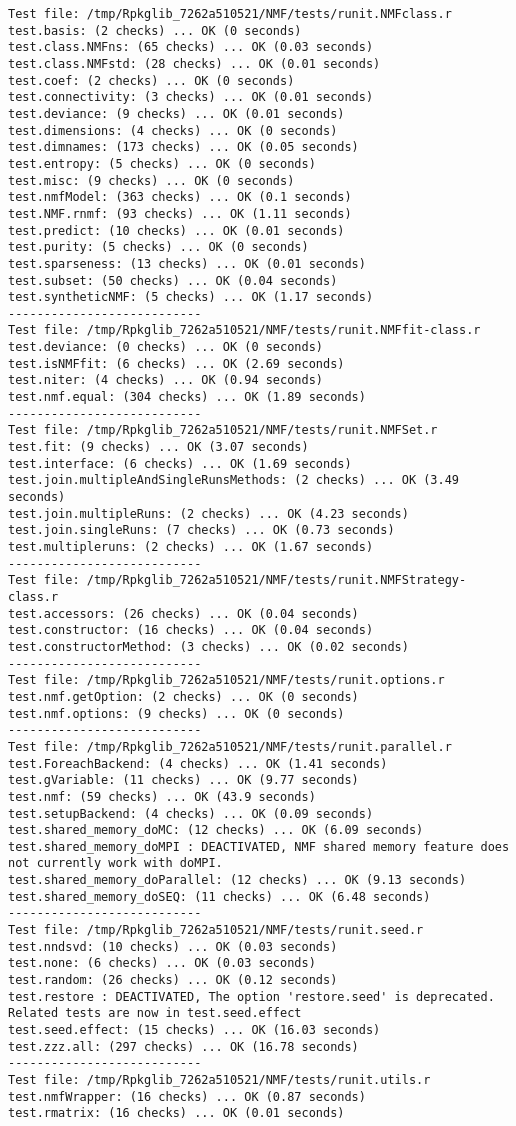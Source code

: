 \documentclass[10pt]{article}\usepackage[]{graphicx}\usepackage[]{color}
\begin{document}
\begin{verbatim}
Test file: /tmp/Rpkglib_7262a510521/NMF/tests/runit.NMFclass.r 
test.basis: (2 checks) ... OK (0 seconds)
test.class.NMFns: (65 checks) ... OK (0.03 seconds)
test.class.NMFstd: (28 checks) ... OK (0.01 seconds)
test.coef: (2 checks) ... OK (0 seconds)
test.connectivity: (3 checks) ... OK (0.01 seconds)
test.deviance: (9 checks) ... OK (0.01 seconds)
test.dimensions: (4 checks) ... OK (0 seconds)
test.dimnames: (173 checks) ... OK (0.05 seconds)
test.entropy: (5 checks) ... OK (0 seconds)
test.misc: (9 checks) ... OK (0 seconds)
test.nmfModel: (363 checks) ... OK (0.1 seconds)
test.NMF.rnmf: (93 checks) ... OK (1.11 seconds)
test.predict: (10 checks) ... OK (0.01 seconds)
test.purity: (5 checks) ... OK (0 seconds)
test.sparseness: (13 checks) ... OK (0.01 seconds)
test.subset: (50 checks) ... OK (0.04 seconds)
test.syntheticNMF: (5 checks) ... OK (1.17 seconds)
--------------------------- 
Test file: /tmp/Rpkglib_7262a510521/NMF/tests/runit.NMFfit-class.r 
test.deviance: (0 checks) ... OK (0 seconds)
test.isNMFfit: (6 checks) ... OK (2.69 seconds)
test.niter: (4 checks) ... OK (0.94 seconds)
test.nmf.equal: (304 checks) ... OK (1.89 seconds)
--------------------------- 
Test file: /tmp/Rpkglib_7262a510521/NMF/tests/runit.NMFSet.r 
test.fit: (9 checks) ... OK (3.07 seconds)
test.interface: (6 checks) ... OK (1.69 seconds)
test.join.multipleAndSingleRunsMethods: (2 checks) ... OK (3.49 seconds)
test.join.multipleRuns: (2 checks) ... OK (4.23 seconds)
test.join.singleRuns: (7 checks) ... OK (0.73 seconds)
test.multipleruns: (2 checks) ... OK (1.67 seconds)
--------------------------- 
Test file: /tmp/Rpkglib_7262a510521/NMF/tests/runit.NMFStrategy-class.r 
test.accessors: (26 checks) ... OK (0.04 seconds)
test.constructor: (16 checks) ... OK (0.04 seconds)
test.constructorMethod: (3 checks) ... OK (0.02 seconds)
--------------------------- 
Test file: /tmp/Rpkglib_7262a510521/NMF/tests/runit.options.r 
test.nmf.getOption: (2 checks) ... OK (0 seconds)
test.nmf.options: (9 checks) ... OK (0 seconds)
--------------------------- 
Test file: /tmp/Rpkglib_7262a510521/NMF/tests/runit.parallel.r 
test.ForeachBackend: (4 checks) ... OK (1.41 seconds)
test.gVariable: (11 checks) ... OK (9.77 seconds)
test.nmf: (59 checks) ... OK (43.9 seconds)
test.setupBackend: (4 checks) ... OK (0.09 seconds)
test.shared_memory_doMC: (12 checks) ... OK (6.09 seconds)
test.shared_memory_doMPI : DEACTIVATED, NMF shared memory feature does not currently work with doMPI.
test.shared_memory_doParallel: (12 checks) ... OK (9.13 seconds)
test.shared_memory_doSEQ: (11 checks) ... OK (6.48 seconds)
--------------------------- 
Test file: /tmp/Rpkglib_7262a510521/NMF/tests/runit.seed.r 
test.nndsvd: (10 checks) ... OK (0.03 seconds)
test.none: (6 checks) ... OK (0.03 seconds)
test.random: (26 checks) ... OK (0.12 seconds)
test.restore : DEACTIVATED, The option 'restore.seed' is deprecated. Related tests are now in test.seed.effect
test.seed.effect: (15 checks) ... OK (16.03 seconds)
test.zzz.all: (297 checks) ... OK (16.78 seconds)
--------------------------- 
Test file: /tmp/Rpkglib_7262a510521/NMF/tests/runit.utils.r 
test.nmfWrapper: (16 checks) ... OK (0.87 seconds)
test.rmatrix: (16 checks) ... OK (0.01 seconds)


\end{verbatim}
\end{document}
